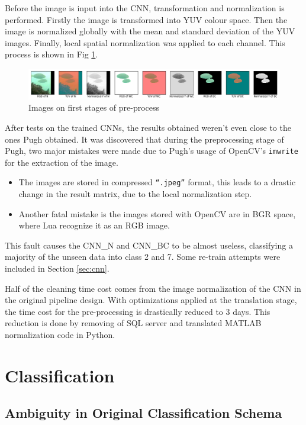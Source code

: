 \documentclass[bsc,frontabs,twoside,fullspacing,parskip,deptreport]{infthesis}
\begin{document}
Before the image is input into the CNN, transformation and normalization is performed. 
Firstly the image is transformed into YUV colour space.
Then the image is normalized globally with the mean and standard deviation of the YUV images.
Finally, local spatial normalization was applied to each channel.
This process is shown in Fig \ref{fig:imageprepro}.

\begin{figure}[ht]
\centering
    \includegraphics[scale=0.4]{graph/imagepre.png}
    \caption{Images on first stages of pre-process}
    \label{fig:imageprepro}
\end{figure}

After tests on the trained CNNs, the results obtained weren't even close to the ones Pugh obtained.
It was discovered that during the preprocessing stage of Pugh, two major mistakes were made due to Pugh's usage of OpenCV's {\tt imwrite} for the extraction of the image.

\begin{itemize}
\setlength{\parskip}{1pt}
\item
The images are stored in compressed {\tt ``.jpeg''} format, this leads to a drastic change in the result matrix, due to the local normalization step. 
\item
Another fatal mistake is the images stored with OpenCV are in BGR space, where Lua recognize it as an RGB image.
\end{itemize}
This fault causes the CNN\_N and CNN\_BC to be almost useless, classifying a majority of the unseen data into class 2 and 7. Some re-train attempts were included in Section \ref{sec:cnn}.

Half of the cleaning time cost comes from the image normalization of the CNN in the original pipeline design.
With optimizations applied at the translation stage, the time cost for the pre-processing is drastically reduced to 3 days. 
This reduction is done by removing of SQL server and translated MATLAB normalization code in Python.

\chapter{Classification}
\label{chap:classify}

\section{Ambiguity in Original Classification Schema}
\label{sec:AmbigCS}
\end{document}
